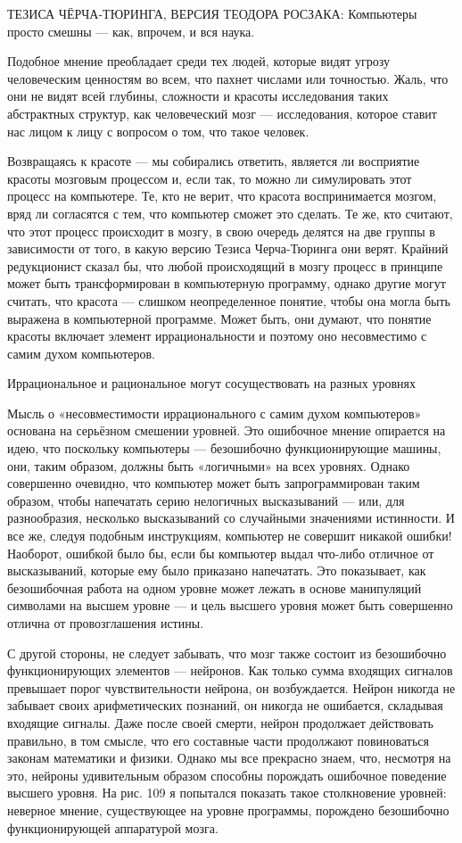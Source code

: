 \documentclass[../main.tex]{subfiles}
\begin{document}
ТЕЗИСА ЧЁРЧА-ТЮРИНГА, ВЕРСИЯ ТЕОДОРА РОСЗАКА: Компьютеры просто смешны --- как, впрочем, и вся наука.

Подобное мнение преобладает среди тех людей, которые видят угрозу человеческим ценностям во всем, что пахнет числами или точностью. Жаль, что они не видят всей глубины, сложности и красоты исследования таких абстрактных структур, как человеческий мозг --- исследования, которое ставит нас лицом к лицу с вопросом о том, что такое человек.

Возвращаясь к красоте --- мы собирались ответить, является ли восприятие красоты мозговым процессом и, если так, то можно ли симулировать этот процесс на компьютере. Те, кто не верит, что красота воспринимается мозгом, вряд ли согласятся с тем, что компьютер сможет это сделать. Те же, кто считают, что этот процесс происходит в мозгу, в свою очередь делятся на две группы в зависимости от того, в какую версию Тезиса Черча-Тюринга они верят. Крайний редукционист сказал бы, что любой происходящий в мозгу процесс в принципе может быть трансформирован в компьютерную программу, однако другие могут считать, что красота --- слишком неопределенное понятие, чтобы она могла быть выражена в компьютерной программе. Может быть, они думают, что понятие красоты включает элемент иррациональности и поэтому оно несовместимо с самим духом компьютеров.

Иррациональное и рациональное могут сосуществовать на разных уровнях

Мысль о «несовместимости иррационального с самим духом компьютеров» основана на серьёзном смешении уровней. Это ошибочное мнение опирается на идею, что поскольку компьютеры --- безошибочно функционирующие машины, они, таким образом, должны быть «логичными» на всех уровнях. Однако совершенно очевидно, что компьютер может быть запрограммирован таким образом, чтобы напечатать серию нелогичных высказываний --- или, для разнообразия, несколько высказываний со случайными значениями истинности. И все же, следуя подобным инструкциям, компьютер не совершит никакой ошибки! Наоборот, ошибкой было бы, если бы компьютер выдал что-либо отличное от высказываний, которые ему было приказано напечатать. Это показывает, как безошибочная работа на одном уровне может лежать в основе манипуляций символами на высшем уровне --- и цель высшего уровня может быть совершенно отлична от провозглашения истины.

С другой стороны, не следует забывать, что мозг также состоит из безошибочно функционирующих элементов --- нейронов. Как только сумма входящих сигналов превышает порог чувствительности нейрона, он возбуждается. Нейрон никогда не забывает своих арифметических познаний, он никогда не ошибается, складывая входящие сигналы. Даже после своей смерти, нейрон продолжает действовать правильно, в том смысле, что его составные части продолжают повиноваться законам математики и физики. Однако мы все прекрасно знаем, что, несмотря на это, нейроны удивительным образом способны порождать ошибочное поведение высшего уровня. На рис. 109 я попытался показать такое столкновение уровней: неверное мнение, существующее на уровне программы, порождено безошибочно функционирующей аппаратурой мозга.
\end{document}
